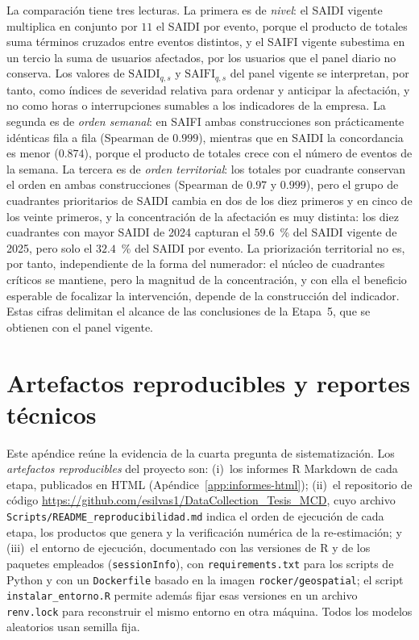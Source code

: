 La comparación tiene tres lecturas. La primera es de \textit{nivel}: el SAIDI vigente multiplica en conjunto por $11$ el SAIDI por evento, porque el producto de totales suma términos cruzados entre eventos distintos, y el SAIFI vigente subestima en un tercio la suma de usuarios afectados, por los usuarios que el panel diario no conserva. Los valores de $\mathrm{SAIDI}_{q,s}$ y $\mathrm{SAIFI}_{q,s}$ del panel vigente se interpretan, por tanto, como índices de severidad relativa para ordenar y anticipar la afectación, y no como horas o interrupciones sumables a los indicadores de la empresa. La segunda es de \textit{orden semanal}: en SAIFI ambas construcciones son prácticamente idénticas fila a fila (Spearman de $0{.}999$), mientras que en SAIDI la concordancia es menor ($0{.}874$), porque el producto de totales crece con el número de eventos de la semana. La tercera es de \textit{orden territorial}: los totales por cuadrante conservan el orden en ambas construcciones (Spearman de $0{.}97$ y $0{.}999$), pero el grupo de cuadrantes prioritarios de SAIDI cambia en dos de los diez primeros y en cinco de los veinte primeros, y la concentración de la afectación es muy distinta: los diez cuadrantes con mayor SAIDI de 2024 capturan el $59{.}6$~\% del SAIDI vigente de 2025, pero solo el $32{.}4$~\% del SAIDI por evento. La priorización territorial no es, por tanto, independiente de la forma del numerador: el núcleo de cuadrantes críticos se mantiene, pero la magnitud de la concentración, y con ella el beneficio esperable de focalizar la intervención, depende de la construcción del indicador. Estas cifras delimitan el alcance de las conclusiones de la Etapa~5, que se obtienen con el panel vigente.

\section{Artefactos reproducibles y reportes técnicos}
\label{app:reportes_tecnicos}

Este apéndice reúne la evidencia de la cuarta pregunta de sistematización. Los \textit{artefactos reproducibles} del proyecto son: (i)~los informes R Markdown de cada etapa, publicados en HTML (Apéndice~\ref{app:informes-html}); (ii)~el repositorio de código \url{https://github.com/esilvas1/DataCollection_Tesis_MCD}, cuyo archivo \texttt{Scripts/README\_reproducibilidad.md} indica el orden de ejecución de cada etapa, los productos que genera y la verificación numérica de la re-estimación; y (iii)~el entorno de ejecución, documentado con las versiones de R y de los paquetes empleados (\texttt{sessionInfo}), con \texttt{requirements.txt} para los scripts de Python y con un \texttt{Dockerfile} basado en la imagen \texttt{rocker/geospatial}; el script \texttt{instalar\_entorno.R} permite además fijar esas versiones en un archivo \texttt{renv.lock} para reconstruir el mismo entorno en otra máquina. Todos los modelos aleatorios usan semilla fija.

